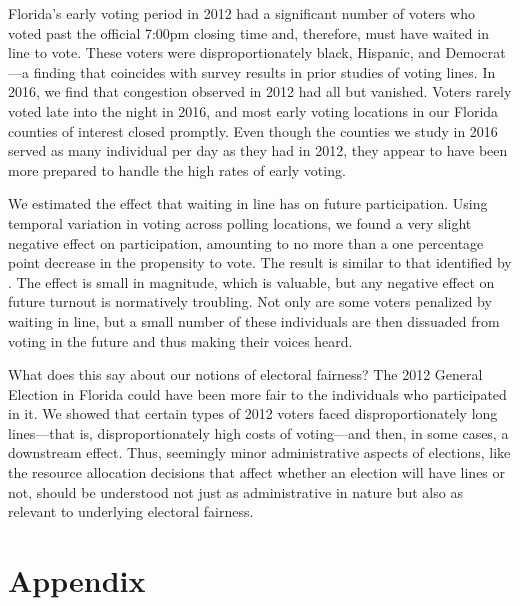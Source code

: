 \documentclass[12pt,titlepage]{article}
\begin{document}
Florida's early voting period in 2012 had a significant number of
voters who voted past the official 7:00pm closing time and, therefore,
must have waited in line to vote.  These voters were
disproportionately black, Hispanic, and Democrat---a finding that
coincides with survey results in prior studies of voting lines.  In
2016, we find that congestion observed in 2012 had all but vanished.
Voters rarely voted late into the night in 2016, and most early voting
locations in our Florida counties of interest closed promptly.  Even
though the counties we study in 2016 served as many individual per day
as they had in 2012, they appear to have been more prepared to handle
the high rates of early voting.
  
We estimated the effect that waiting in line has on future
participation.  Using temporal variation in voting across polling
locations, we found a very slight negative effect on participation,
amounting to no more than a one percentage point decrease in the
propensity to vote. The result is similar to that identified by
\citet{pettigrew:racegapwaittimes}.  The effect is small in magnitude,
which is valuable, but any negative effect on future turnout is
normatively troubling.  Not only are some voters penalized by waiting
in line, but a small number of these individuals are then dissuaded
from voting in the future and thus making their voices heard.

What does this say about our notions of electoral fairness?  The 2012
General Election in Florida could have been more fair to the
individuals who participated in it.  We showed that certain types of
2012 voters faced disproportionately long lines---that is,
disproportionately high costs of voting---and then, in some cases, a
downstream effect.  Thus, seemingly minor administrative aspects of
elections, like the resource allocation decisions that affect whether
an election will have lines or not, should be understood not just as
administrative in nature but also as relevant to underlying electoral
fairness.




% 

\clearpage
\newpage




\newpage
\appendix
\section*{Appendix}

 
\end{document}
